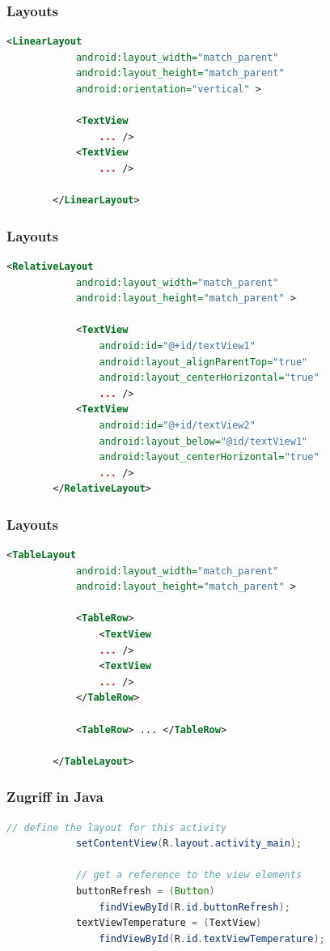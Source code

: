 \begin{frame}[fragile]
	\frametitle{Layouts}
	\vspace{-2mm}
	\begin{lstlisting}[language=XML]
		<LinearLayout
		    android:layout_width="match_parent"
		    android:layout_height="match_parent"
		    android:orientation="vertical" >

		    <TextView
		        ... />
		    <TextView
		        ... />

		</LinearLayout>
    \end{lstlisting}
\end{frame}

\begin{frame}[fragile]
	\frametitle{Layouts}
	\vspace{-2mm}
	\begin{lstlisting}[language=XML]
		<RelativeLayout
		    android:layout_width="match_parent"
		    android:layout_height="match_parent" >

		    <TextView
		        android:id="@+id/textView1"
		        android:layout_alignParentTop="true"
		        android:layout_centerHorizontal="true"
		        ... />
		    <TextView
		        android:id="@+id/textView2"
		        android:layout_below="@id/textView1"
		        android:layout_centerHorizontal="true"
		        ... />
		</RelativeLayout>
    \end{lstlisting}
\end{frame}

\begin{frame}[fragile]
	\frametitle{Layouts}
	\vspace{-2mm}
	\begin{lstlisting}[language=XML]
		<TableLayout
		    android:layout_width="match_parent"
		    android:layout_height="match_parent" >

		    <TableRow>
		        <TextView
		        ... />
		        <TextView
		        ... />
		    </TableRow>

		    <TableRow> ... </TableRow>

		</TableLayout>
    \end{lstlisting}
\end{frame}

\begin{frame}[fragile]
	\frametitle{Zugriff in Java}
	\begin{lstlisting}[language=Java]
		    // define the layout for this activity
		    setContentView(R.layout.activity_main);
		    
		    // get a reference to the view elements
		    buttonRefresh = (Button)
		        findViewById(R.id.buttonRefresh);
		    textViewTemperature = (TextView)
		        findViewById(R.id.textViewTemperature);
    \end{lstlisting}
\end{frame}


